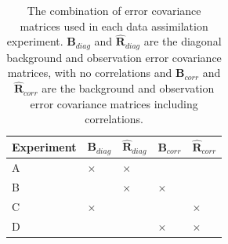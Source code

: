 \documentclass[11pt]{article}
\begin{document}
\begin{table}[ht] 
\begin{center}
	\begin{tabular}{| l | l | l | l | l |}
	\hline
	Experiment & $\textbf{B}_{diag}$ & $\hat{\mathbf{R}}_{diag}$ & $\textbf{B}_{corr}$ &
	$\hat{\mathbf{R}}_{corr}$ \\ \hline
	A & $\times$ & $\times$ & & \\ \hline
	B & & $\times$ & $\times$ & \\ \hline
	C & $\times$ & & & $\times$ \\ \hline
	D & & & $\times$ & $\times$ \\ 
	\hline
	\end{tabular}
	\caption{The combination of error covariance matrices used in each data assimilation experiment. $\textbf{B}_{diag}$ and $\hat{\mathbf{R}}_{diag}$ are the diagonal background and observation error covariance matrices, with no correlations and $\textbf{B}_{corr}$ and $\hat{\mathbf{R}}_{corr}$ are the background and observation error covariance matrices including correlations.}
	\label{table:exps_tab}
\end{center} 
\end{table}
\end{document}
